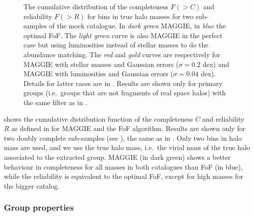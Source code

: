 \begin{figure}[t]
    \centering
    \begin{minipage}{0.49\linewidth}
    \end{minipage}
    \begin{minipage}{0.49\linewidth}
    \end{minipage}
    \caption{The cumulative distribution of the completeness $F(>C)$ and
        reliability $F(>R)$ for bins in true halo masses for two sub-samples of
        the mock catalogue. In \emph{dark green} MAGGIE, in \emph{blue} the
        optimal FoF. The \emph{light green} curve is also MAGGIE in the perfect
        case but using luminosities instead of stellar masses to do the
        abundance matching. The \emph{red} and \emph{gold} curves are
        respectively for MAGGIE with stellar masses and Gaussian errors
        ($\sigma=0.2$ dex) and MAGGIE with luminosities and Gaussian errors
        ($\sigma=0.04$ dex). Details for latter cases are in
        . Results are shown only for
    primary groups (i.e.\ groups that are not fragments of real space halos)
with the same filter as in
.\label{fig:comp_rel}}
\end{figure}

 shows the cumulative distribution function of the
completeness $C$ and reliability $R$ as defined in
 for MAGGIE and the FoF algorithm.
Results are shown only for two doubly complete sub-samples (see
), the same as in
. Only two bins in halo mass are
used, and we use the true halo mass, i.e.\ the virial mass of the true halo
associated to the extracted group. MAGGIE (in dark green) shows a better
behaviour in completeness for all masses in both catalogues than FoF (in blue),
while the reliability is equivalent to the optimal FoF, except for high masses
for the bigger catalog.

\subsubsection{Group properties}

